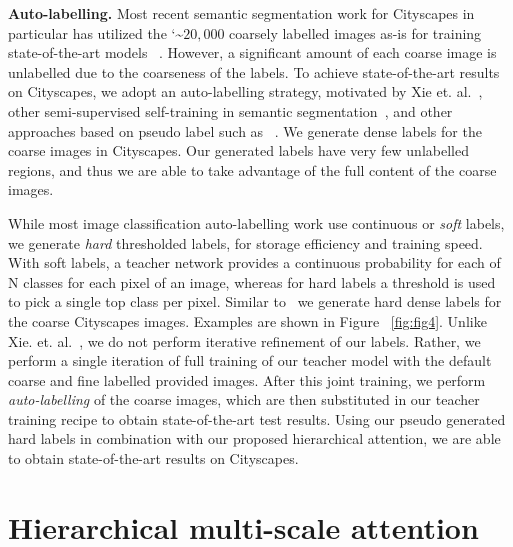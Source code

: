 \documentclass{article}
\begin{document}
\textbf{Auto-labelling.} Most recent semantic segmentation work for Cityscapes in particular has utilized the \char`\~$20,000$ coarsely labelled images as-is for training state-of-the-art models ~\cite{yuan2018ocnet, semantic_cvpr19}. However, a significant amount of each coarse image is unlabelled due to the coarseness of the labels. To achieve state-of-the-art results on Cityscapes, we adopt an auto-labelling strategy, motivated by Xie et. al.~\cite{xie2019selftraining}, other semi-supervised self-training in semantic segmentation~\cite{Lian_2019_Pyramid,Li_2019_bidirection,Luc2017futureSeg,Zou2018DAClassBalance,Zou_2019_CRST}, and other approaches based on pseudo label such as ~\cite{lee2013pseudo,iscen2019label,shi2018transductive,arazo2019pseudo}. We generate dense labels for the coarse images in Cityscapes. Our generated labels have very few unlabelled regions, and thus we are able to take advantage of the full content of the coarse images.

While most image classification auto-labelling work use continuous or \textit{soft} labels, we generate \textit{hard} thresholded labels, for storage efficiency and training speed. With soft labels, a teacher network provides a continuous probability for each of N classes for each pixel of an image, whereas for hard labels a threshold is used to pick a single top class per pixel. Similar to~\cite{li2019decoupled,lee2013pseudo} we generate hard dense labels for the coarse Cityscapes images. Examples are shown in Figure ~\ref{fig:fig4}. Unlike Xie. et. al.~\cite{xie2019selftraining}, we do not perform iterative refinement of our labels. Rather, we perform a single iteration of full training of our teacher model with the default coarse and fine labelled provided images. After this joint training, we perform \emph{auto-labelling} of the coarse images, which are then substituted in our teacher training recipe to obtain state-of-the-art test results. Using our pseudo generated hard labels in combination with our proposed hierarchical attention, we are able to obtain state-of-the-art results on Cityscapes.

\section{Hierarchical multi-scale attention}
\label{sec:headings}
\end{document}
